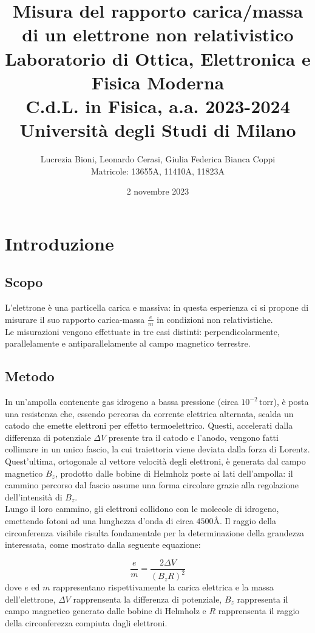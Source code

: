 \documentclass[]{article}
\title{%
    \Huge Misura del rapporto carica/massa di un elettrone non relativistico \\
    \Large Laboratorio di Ottica, Elettronica e Fisica Moderna \\ C.d.L. in Fisica, a.a. 2023-2024 \\ Università degli Studi di Milano}
\author{\LARGE Lucrezia Bioni, Leonardo Cerasi, Giulia Federica Bianca Coppi \\ Matricole: 13655A, 11410A, 11823A}
\date{2 novembre 2023}
\let\oldsection\section%
\renewcommand{\section}{%
	\renewcommand{\theequation}{\thesection.\arabic{equation}}%
	\oldsection}%
\let\oldsubsection\subsection%
\renewcommand{\subsection}{%
	\renewcommand{\theequation}{\thesubsection.\arabic{equation}}%
	\oldsubsection}%
\begin{document}
    \maketitle

    \section{Introduzione}

    \subsection{Scopo}

    L'elettrone è una particella carica e massiva: in questa esperienza ci si propone di misurare il suo rapporto carica-massa $ \frac{e}{m} $ in condizioni non relativistiche. \\
    Le misurazioni vengono effettuate in tre casi distinti: perpendicolarmente, parallelamente e antiparallelamente al campo magnetico terrestre.


    \subsection{Metodo}
    In un'ampolla contenente gas idrogeno a bassa pressione (circa $ 10^{-2}\, \text{torr} $), è posta una resistenza che, essendo percorsa da corrente elettrica alternata, scalda un catodo che emette elettroni per effetto termoelettrico. Questi, accelerati dalla differenza di potenziale $\Delta V$ presente tra il catodo e l'anodo, vengono fatti collimare in un unico fascio, la cui traiettoria viene deviata dalla forza di Lorentz. Quest'ultima, ortogonale al vettore velocità degli elettroni, è generata dal campo magnetico $ B_z $, prodotto dalle bobine di Helmholz poste ai lati dell'ampolla: il cammino percorso dal fascio assume una forma circolare grazie alla regolazione dell'intensità di $B_z$. \\
    Lungo il loro cammino, gli elettroni collidono con le molecole di idrogeno, emettendo fotoni ad una lunghezza d'onda di circa $4500 \text{Å}$.
    Il raggio della circonferenza visibile risulta fondamentale per la determinazione della grandezza interessata, come mostrato dalla seguente equazione:

    \begin{equation}
        \label{e_m}
        \frac{e}{m} = \frac{2 \Delta V}{(B_z R)^2}
    \end{equation}
    dove $ e $ ed $ m $ rappresentano rispettivamente la carica elettrica e la massa dell'elettrone, $\Delta V$ rapprensenta la differenza di potenziale, $B_z$ rappresenta il campo magnetico generato dalle bobine di Helmholz e $ R $ rapprensenta il raggio della circonferezza compiuta dagli elettroni. \\
\end{document}
